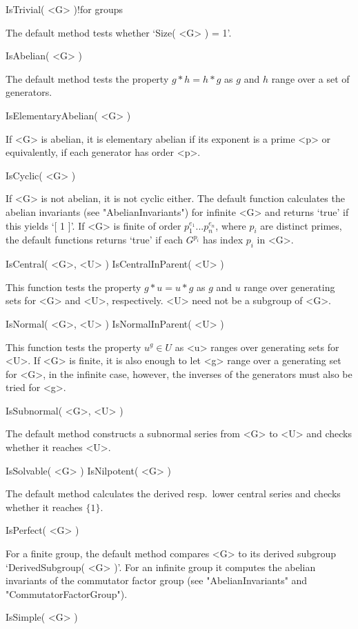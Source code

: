 \>IsTrivial( <G> )!{for groups}

The default method tests whether `Size( <G> ) = 1'.

\>IsAbelian( <G> )

The default method tests  the property $g*h  = h*g$ as  $g$ and $h$ range
over a set of generators.

\>IsElementaryAbelian( <G> )

If <G>  is abelian, it  is elementary abelian  if its exponent is a prime
<p> or equivalently, if each generator has order <p>.

\>IsCyclic( <G> )

If  <G> is not  abelian, it is  not cyclic either.   The default function
calculates the abelian  invariants (see "AbelianInvariants") for infinite
<G> and returns `true' if this yields `[ 1 ]'.  If <G> is finite of order
$p_1^{e_1}  ... p_n^{e_n}$, where $p_i$  are distinct primes, the default
functions returns `true' if each $G^{p_i}$ has index $p_i$ in <G>.

\>IsCentral( <G>, <U> )
\>IsCentralInParent( <U> )

This function tests the  property $g*u =  u*g$ as $g$  and $u$ range over
generating sets for <G> and <U>, respectively. <U> need not be a subgroup
of <G>.

\>IsNormal( <G>, <U> )
\>IsNormalInParent( <U> )

This function tests the property $u^g\in U$ as <u> ranges over generating
sets for <U>. If <G> is finite, it is also enough to let <g> range over a
generating set  for <G>, in the  infinite case, however, the  inverses of
the generators must also be tried for <g>.

\>IsSubnormal( <G>, <U> )

The default  method constructs  a subnormal series   from <G> to  <U> and
checks whether it reaches <U>.

\>IsSolvable( <G> )
\>IsNilpotent( <G> )

The default method calculates the derived resp.\ lower central series and
checks whether it reaches $\{1\}$.

\>IsPerfect( <G> )

For a  finite   group, the default  method  compares  <G> to its  derived
subgroup `DerivedSubgroup( <G> )'. For an infinite  group it computes the
abelian    invariants   of    the    commutator    factor   group    (see
"AbelianInvariants" and "CommutatorFactorGroup").

\>IsSimple( <G> )

